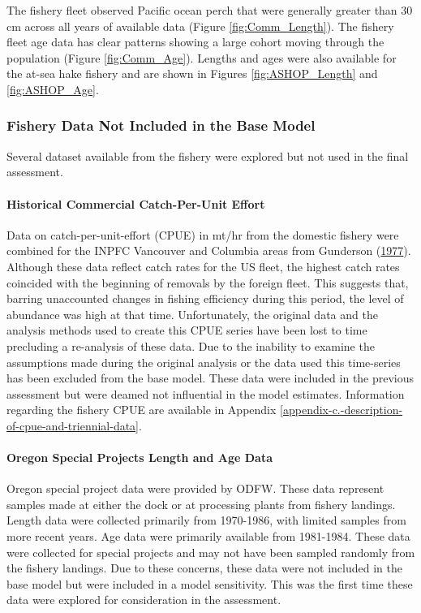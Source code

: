 \documentclass[12pt,]{article}
\let\oldparagraph\paragraph
\renewcommand{\paragraph}[1]{\oldparagraph{#1}\mbox{}}
\begin{document}
The fishery fleet observed Pacific ocean perch that were generally
greater than 30 cm across all years of available data (Figure
\ref{fig:Comm_Length}). The fishery fleet age data has clear patterns
showing a large cohort moving through the population (Figure
\ref{fig:Comm_Age}). Lengths and ages were also available for the at-sea
hake fishery and are shown in Figures \ref{fig:ASHOP_Length} and
\ref{fig:ASHOP_Age}.

\subsubsection{Fishery Data Not Included in the Base
Model}\label{fishery-data-not-included-in-the-base-model}

Several dataset available from the fishery were explored but not used in
the final assessment.

\paragraph{Historical Commercial Catch-Per-Unit
Effort}\label{historical-commercial-catch-per-unit-effort}

Data on catch-per-unit-effort (CPUE) in mt/hr from the domestic fishery
were combined for the INPFC Vancouver and Columbia areas from Gunderson
(\protect\hyperlink{ref-gunderson_population_1977}{1977}). Although
these data reflect catch rates for the US fleet, the highest catch rates
coincided with the beginning of removals by the foreign fleet. This
suggests that, barring unaccounted changes in fishing efficiency during
this period, the level of abundance was high at that time.
Unfortunately, the original data and the analysis methods used to create
this CPUE series have been lost to time precluding a re-analysis of
these data. Due to the inability to examine the assumptions made during
the original analysis or the data used this time-series has been
excluded from the base model. These data were included in the previous
assessment but were deamed not influential in the model estimates.
Information regarding the fishery CPUE are available in Appendix
\ref{appendix-c.-description-of-cpue-and-triennial-data}.

\paragraph{Oregon Special Projects Length and Age
Data}\label{oregon-special-projects-length-and-age-data}

Oregon special project data were provided by ODFW. These data represent
samples made at either the dock or at processing plants from fishery
landings. Length data were collected primarily from 1970-1986, with
limited samples from more recent years. Age data were primarily
available from 1981-1984. These data were collected for special projects
and may not have been sampled randomly from the fishery landings. Due to
these concerns, these data were not included in the base model but were
included in a model sensitivity. This was the first time these data were
explored for consideration in the assessment.
\end{document}
